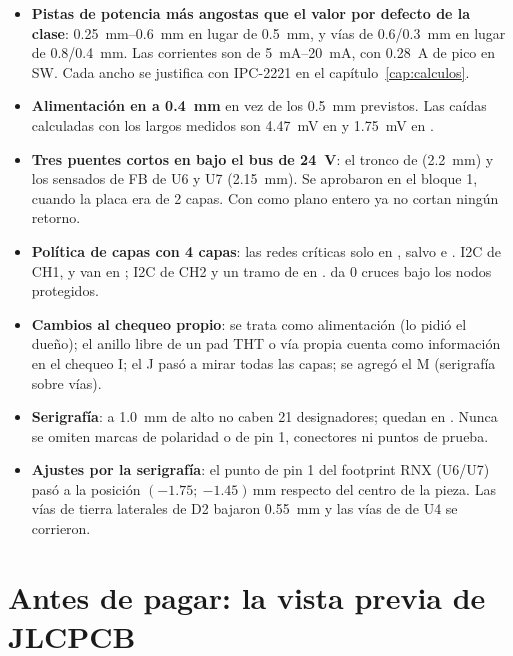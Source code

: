 \begin{itemize}
  \item \textbf{Pistas de potencia más angostas que el valor por defecto de la clase}: \SIrange{0.25}{0.6}{\milli\meter}
  en lugar de \SI{0.5}{\milli\meter}, y vías de \num{0.6}/\SI{0.3}{\milli\meter} en lugar de \num{0.8}/\SI{0.4}{\milli\meter}.
  Las corrientes son de \SIrange{5}{20}{\milli\ampere}, con \SI{0.28}{\ampere} de pico en SW. Cada ancho se justifica
  con IPC-2221 en el capítulo~\ref{cap:calculos}.
  \item \textbf{Alimentación en  a \SI{0.4}{\milli\meter}} en vez de los \SI{0.5}{\milli\meter} previstos.
  Las caídas calculadas con los largos medidos son \SI{4.47}{\milli\volt} en  y \SI{1.75}{\milli\volt} en
  .
  \item \textbf{Tres puentes cortos en  bajo el bus de \SI{24}{\volt}}: el tronco de 
  (\SI{2.2}{\milli\meter}) y los sensados de FB de U6 y U7 (\SI{2.15}{\milli\meter}). Se aprobaron en el bloque 1,
  cuando la placa era de 2 capas. Con  como plano entero ya no cortan ningún retorno.
  \item \textbf{Política de capas con 4 capas}: las redes críticas solo en , salvo  e
  . I2C de CH1,  y  van en ; I2C de CH2 y un tramo de
   en .  da 0 cruces bajo los nodos protegidos.
  \item \textbf{Cambios al chequeo propio}:  se trata como alimentación (lo pidió el dueño); el anillo
  libre de un pad THT o vía propia cuenta como información en el chequeo I; el J pasó a mirar todas las capas; se
  agregó el M (serigrafía sobre vías).
  \item \textbf{Serigrafía}: a \SI{1.0}{\milli\meter} de alto no caben 21 designadores; quedan en
  . Nunca se omiten marcas de polaridad o de pin 1, conectores ni puntos de prueba.
  \item \textbf{Ajustes por la serigrafía}: el punto de pin 1 del footprint RNX (U6/U7) pasó a la posición
  $(\num{-1.75};\ \num{-1.45})\,\si{\milli\meter}$ respecto del centro de la pieza. Las vías de tierra laterales de D2
  bajaron \SI{0.55}{\milli\meter} y las vías de  de U4 se corrieron.
\end{itemize}

\section{Antes de pagar: la vista previa de JLCPCB}\label{sec:c12-dfm}

